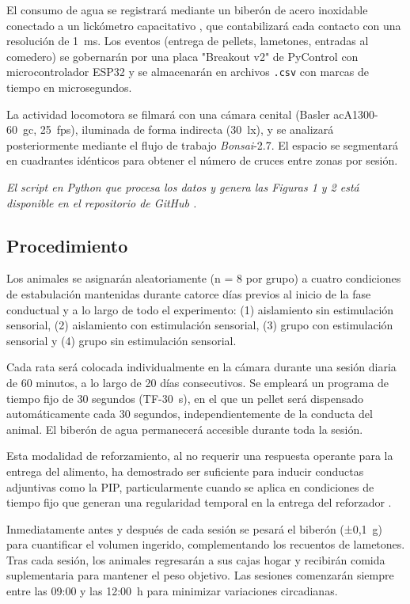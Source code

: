 \documentclass[12pt,a4paper]{article}
\begin{document}
\begin{multicols}{2}
El consumo de agua se registrará mediante un biberón de acero inoxidable conectado a un lickómetro capacitativo \citep{pycontrol_lickometer}, que contabilizará cada contacto con una resolución de 1~ms. Los eventos (entrega de pellets, lametones, entradas al comedero) se gobernarán por una placa "Breakout v2" de PyControl con microcontrolador ESP32 y se almacenarán en archivos \texttt{.csv} con marcas de tiempo en microsegundos.

La actividad locomotora se filmará con una cámara cenital (Basler acA1300-60~gc, 25~fps), iluminada de forma indirecta (30~lx), y se analizará posteriormente mediante el flujo de trabajo \textit{Bonsai}-2.7. El espacio se segmentará en cuadrantes idénticos para obtener el número de cruces entre zonas por sesión.

\textit{El script en Python que procesa los datos y genera las Figuras 1 y 2 está disponible en el repositorio de GitHub \citep{Pena2025}.
}

\subsection*{Procedimiento}

Los animales se asignarán aleatoriamente (n = 8 por grupo) a cuatro condiciones de estabulación mantenidas durante catorce días previos al inicio de la fase conductual y a lo largo de todo el experimento: (1) aislamiento sin estimulación sensorial, (2) aislamiento con estimulación sensorial, (3) grupo con estimulación sensorial y (4) grupo sin estimulación sensorial.


Cada rata será colocada individualmente en la cámara durante una sesión diaria de 60 minutos, a lo largo de 20 días consecutivos. Se empleará un programa de tiempo fijo de 30 segundos (TF-30~s), en el que un pellet será dispensado automáticamente cada 30 segundos, independientemente de la conducta del animal. El biberón de agua permanecerá accesible durante toda la sesión.

Esta modalidad de reforzamiento, al no requerir una respuesta operante para la entrega del alimento, ha demostrado ser suficiente para inducir conductas adjuntivas como la PIP, particularmente cuando se aplica en condiciones de tiempo fijo que generan una regularidad temporal en la entrega del reforzador \citep{LASHLEY1980411}.

Inmediatamente antes y después de cada sesión se pesará el biberón (±0,1~g) para cuantificar el volumen ingerido, complementando los recuentos de lametones. Tras cada sesión, los animales regresarán a sus cajas hogar y recibirán comida suplementaria para mantener el peso objetivo. Las sesiones comenzarán siempre entre las 09:00 y las 12:00~h para minimizar variaciones circadianas.


\end{multicols}
\end{document}
